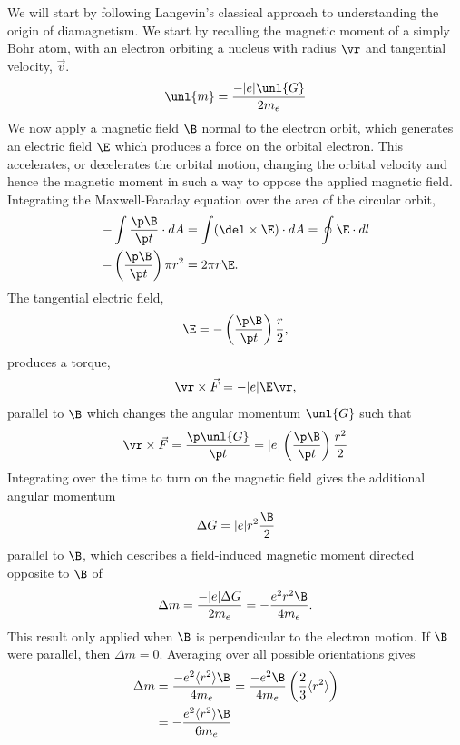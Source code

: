 \documentclass[a4paper, 11pt, normalem]{report}
\begin{document}
We will start by following Langevin's classical approach to understanding the origin of diamagnetism.
We start by recalling the magnetic moment of a simply Bohr atom, with an electron orbiting a nucleus with radius $\vr$ and tangential velocity, $\vec{v}$.
\begin{equation}
    \unl{m} = \frac{-|e|\unl{G}}{2m_e}
\end{equation}
We now apply a magnetic field $\B$ normal to the electron orbit, which generates an electric field $\E$ which produces a force on the orbital electron. 
This accelerates, or decelerates the orbital motion, changing the orbital velocity and hence the magnetic moment in such a way to oppose the applied magnetic field. 
Integrating the Maxwell-Faraday equation over the area of the circular orbit, 
\begin{align}
    -\int \frac{\p\B}{\p t}\cdot dA &= \int (\del\times\E)\cdot dA = \oint \E\cdot dl \\
    -\left(\frac{\p\B}{\p t}\right)\pi r^2 &= 2\pi r\E.
\end{align}
The tangential electric field, 
\begin{equation}
    \E = -\left(\frac{\p\B}{\p t}\right)\frac{r}{2},
\end{equation}
produces a torque,
\begin{equation}
    \vr\times\vec{F} = -|e|\E\vr,
\end{equation}
parallel to $\B$ which changes the angular momentum $\unl{G}$ such that
\begin{equation}
    \vr\times\vec{F} = \frac{\p\unl{G}}{\p t} = |e|\left(\frac{\p\B}{\p t}\right)\frac{r^2}{2}
\end{equation}
Integrating over the time to turn on the magnetic field gives the additional angular momentum
\begin{equation}
    \Delta G = |e|r^2\frac{\B}{2}
\end{equation}
parallel to $\B$, which describes a field-induced magnetic moment directed opposite to $\B$ of
\begin{equation}
    \Delta m = \frac{-|e|\Delta G}{2m_e} = -\frac{e^2r^2\B}{4m_e}.
\end{equation}
This result only applied when $\B$ is perpendicular to the electron motion. 
If $\B$ were parallel, then $\Delta m = 0$.
Averaging over all possible orientations gives
\begin{align}
    \Delta m &= \frac{-e^2\langle r^2\rangle\B}{4m_e} = \frac{-e^2\B}{4m_e}\left(\frac23\langle r^2\rangle\right) \\
             &= -\frac{e^2\langle r^2\rangle\B}{6m_e} 
\end{align}
\end{document}
